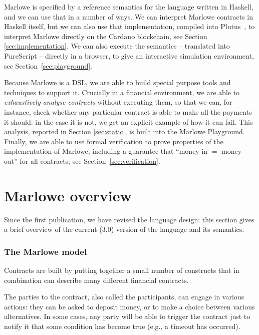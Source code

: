 \documentclass[runningheads]{llncs}
\begin{document}
Marlowe is specified by a reference semantics for the language written in Haskell, and we can use that in a number of ways. We can interpret Marlowe contracts in Haskell itself, but we can also use that implementation, compiled into Plutus~\cite{PlutusPlatform}, to interpret Marlowe directly on the Cardano blockchain, see Section \ref{sec:implementation}. We can also execute the semantics -- translated into PureScript -- directly in a browser, to give an interactive simulation environment, see Section~\ref{sec:playground}.

Because Marlowe is a DSL, we are able to build special purpose tools and techniques to support it. Crucially in a financial environment, we are able to \emph{exhaustively analyse contracts} without executing them, so that we can, for instance, check whether any particular contract is able to make all the payments it should: in the case it is not, we get an explicit example of how it can fail. This analysis, reported in Section \ref{sec:static}, is built into the Marlowe Playground. Finally, we are able to use formal verification to prove properties of the implementation of Marlowe, including a guarantee that ``money in $=$ money out'' for all contracts; see Section~\ref{sec:verification}.

\section{Marlowe overview}
\label{sec:overview}

Since the first publication, we have revised the language design: this section gives a brief overview of the current (3.0) version of the language and its semantics.


\subsubsection*{The Marlowe model}

Contracts are built by putting together a small number of constructs that in combination can  describe many different financial contracts.

The parties to the contract, also called the participants, can engage in various actions: they can be asked to deposit money, or to make a choice between various alternatives. In some cases, any party will be able to trigger the contract just to notify it that some condition has become true (e.g., a timeout has occurred).
\end{document}
